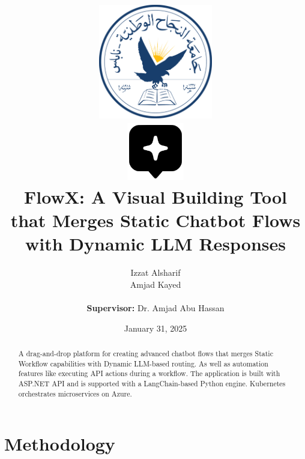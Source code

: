 \documentclass[12pt, a4paper]{report}
\title{
    \includegraphics[height=5cm]{assets/NNU_Logo.png} \\[1cm]
    \includegraphics[height=2.5cm]{assets/FlowX_Logo.png} \\[1cm]
    FlowX: A Visual Building Tool that Merges Static Chatbot Flows with Dynamic LLM Responses
}
\author{
    Izzat Alsharif \\
    Amjad Kayed
    \\\\
    \textbf{Supervisor:} Dr. Amjad Abu Hassan
}
\date{January 31, 2025}
\begin{document}
\maketitle
\tableofcontents
\listoffigures
\listoftables

\begin{abstract}

A drag-and-drop platform for creating advanced chatbot flows that merges Static Workflow capabilities with Dynamic LLM-based routing. As well as automation features like executing API actions during a workflow. The application is built with ASP.NET API and is supported with a LangChain-based Python engine. Kubernetes orchestrates microservices on Azure.

\end{abstract}






\chapter{Methodology}










\renewcommand{\bibname}{References}


\end{document}
